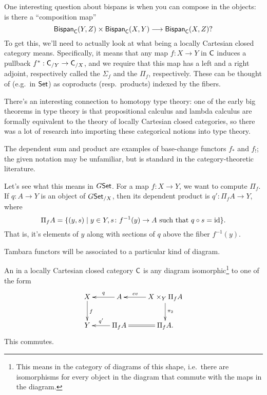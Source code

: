 One interesting question about bispans is when you can compose in the objects: is there a ``composition map''
\begin{equation}
\label{compbispan}
\mathsf{Bispan}_\mathsf C(Y,Z)\times\mathsf{Bispan}_\mathsf C(X,Y)\longrightarrow\mathsf{Bispan}_\mathsf C(X,Z)?
\end{equation}
To get this, we'll need to actually look at what being a locally Cartesian closed category means. Specifically, it means that any map $f\colon X\to Y$ in $\mathsf C$ induces a pullback
$f^*:\mathsf C_{/Y}\to\mathsf C_{/X}$, and we require that this map has a left and a right adjoint, respectively called the
 $\Sigma_f$ and the  $\Pi_f$, respectively. These can be thought of
(e.g.\ in $\mathsf{Set}$) as coproducts (resp.\ products) indexed by the fibers.
\begin{rem}
There's an interesting connection to homotopy type theory: one of the early big theorems in type theory is that
propositional calculus and lambda calculus are formally equivalent to the theory of locally Cartesian closed
categories, so there was a lot of research into importing these categorical notions into type
theory.

The dependent sum and product are examples of base-change functors $f_*$ and $f_!$; the given notation may be
unfamiliar, but is standard in the category-theoretic literature.
\end{rem}
\begin{exm}
Let's see what this means in $G\mathsf{Set}$. For a map $f\colon X\to Y$, we want to compute $\Pi_f$. If $q\colon A\to Y$
is an object of $G\mathsf{Set}_{/X}$, then its dependent product is $q'\colon \Pi_fA\to Y$, where
\[\Pi_f A = \{(y,s)\mid y\in Y, s\colon f^{-1}(y)\to A\text{ such that } q\circ s = \mathrm{id}\}.\]
That is, it's elements of $y$ along with sections of $q$ above the fiber $f^{-1}(y)$.
\end{exm}
Tambara functors will be associated to a particular kind of diagram.
\begin{defn}
An  in a locally Cartesian closed category $\mathsf C$ is any diagram isomorphic\footnote{This
means in the category of diagrams of this shape, i.e.\ there are isomorphisms for every object in the diagram that
commute with the maps in the diagram.} to one of the form
\begin{equation}
\label{exponential}
\gathxy{
	X\ar[d]^f & A\ar[l]_-q & X\times_Y \Pi_f A\ar[l]_-{\mathit{ev}}\ar[d]^{\pi_2}\\
	Y & \Pi_f A\ar[l]_-{q'} & \Pi_fA.\ar@{=}[l]
}
\end{equation}
This commutes.
\end{defn}

